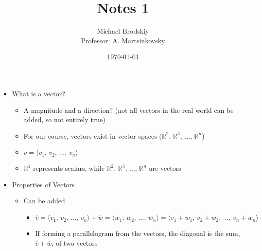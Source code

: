 

\title{Notes 1}
\date{\today}
\author{Michael Brodskiy\\ \small Professor: A. Martsinkovsky}



\maketitle

\begin{itemize}

  \item What is a vector?

    \begin{itemize}

      \item A magnitude and a direction? (not all vectors in the real world can be added, so not entirely true)

      \item For our course, vectors exist in vector spaces ($\mathbb{R}^2,\,\mathbb{R}^3,\,\dots,\,\mathbb{R}^n$)

      \item $\overline{v}=\langle v_1,\,v_2,\,\dots,\,v_n \rangle$

      \item $\mathbb{R}^1$ represents scalars, while $\mathbb{R}^2,\,\mathbb{R}^3,\,\dots,\,\mathbb{R}^n$ are vectors

    \end{itemize}

  \item Properties of Vectors

    \begin{itemize}

      \item Can be added

        \begin{itemize}

          \item $\overline{v}=\langle v_1,\,v_2,\,\dots,\,v_n \rangle + \overline{w}=\langle w_1,\,w_2,\,\dots,\,w_n \rangle = \langle v_1+w_1,\,v_2+w_2,\,\dots,\,v_n+w_n \rangle$

          \item If forming a parallelogram from the vectors, the diagonal is the sum, $\overline{v}+\overline{w}$, of two vectors

        \end{itemize}


\end{itemize}
\end{itemize}
